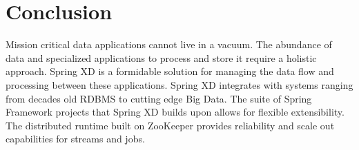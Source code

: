 \section{Conclusion}

Mission critical data applications cannot live in a vacuum. The abundance of data
and specialized applications to process and store it require a holistic approach.
Spring XD is a formidable solution for managing the data flow and processing
between these applications. Spring XD integrates with systems ranging from decades
old RDBMS to cutting edge Big Data. The suite of Spring Framework projects that
Spring XD builds upon allows for flexible extensibility. The distributed runtime
built on ZooKeeper provides reliability and scale out capabilities for streams
and jobs. 
